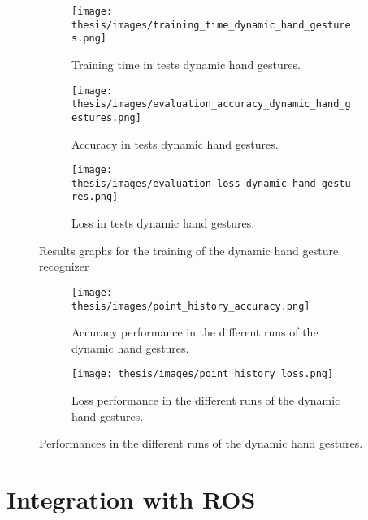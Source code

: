 \documentclass[../thesis.tex]{subfiles}
\begin{document}
\begin{figure}[H]
     \centering
     \begin{subfigure}[b]{0.45\textwidth}
         \centering
         \texttt{[image: thesis/images/training\_time\_dynamic\_hand\_gestures.png]}
         \caption{Training time in tests dynamic hand gestures.}
         \label{fig:training_time_dynamic_hand_gestures}
     \end{subfigure}
     \hfill
     \begin{subfigure}[b]{0.45\textwidth}
         \centering
         \texttt{[image: thesis/images/evaluation\_accuracy\_dynamic\_hand\_gestures.png]}
         \caption{Accuracy in tests dynamic hand gestures.}
         \label{fig:evaluation_accuracy_dynamic_hand_gestures}
     \end{subfigure}
     \hfill
     \begin{subfigure}[b]{0.45\textwidth}
         \centering
         \texttt{[image: thesis/images/evaluation\_loss\_dynamic\_hand\_gestures.png]}
         \caption{Loss in tests dynamic hand gestures.}
         \label{fig:evaluation_loss_dynamic_hand_gestures.}
     \end{subfigure}
        \caption{Results graphs for the training of the dynamic hand gesture recognizer}
        \label{fig:results_graphs_dynamic_hand_gestures}
\end{figure}

\begin{figure}[H]
\centering
\begin{subfigure}[b]{\textwidth}
    \centering
    \texttt{[image: thesis/images/point\_history\_accuracy.png]}
    \caption{Accuracy performance in the different runs of the dynamic hand gestures.}
    \label{fig:accuracy_performance_dynamic_hand_gestures}
\end{subfigure}
\hfill
\begin{subfigure}[b]{\textwidth}
    \centering
    \texttt{[image: thesis/images/point\_history\_loss.png]}
    \caption{Loss performance in the different runs of the dynamic hand gestures.}
    \label{fig:loss_performance_dynamic_hand_gestures}
\end{subfigure}
\caption{Performances in the different runs of the dynamic hand gestures.}
\label{fig:performances_dynamic_hand_gestures}
\end{figure}

\section{Integration with ROS}
\end{document}
